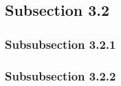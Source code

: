 \lipsum[13-15]

\subsection{Subsection 3.2}

\lipsum[16-18]

\subsubsection{Subsubsection 3.2.1}

\lipsum[19-21]

\subsubsection{Subsubsection 3.2.2}

\lipsum[22-23]



